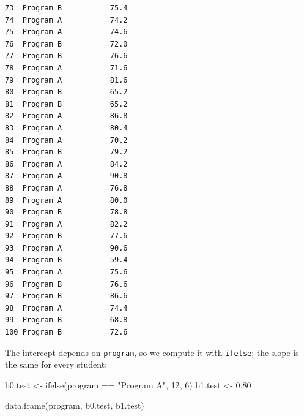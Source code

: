 \documentclass[
  letterpaper,
  DIV=11,
  numbers=noendperiod]{scrreprt}
\newenvironment{Shaded}{\begin{snugshade}}{\end{snugshade}}
\newcommand{\DecValTok}[1]{\textcolor[rgb]{0.68,0.00,0.00}{#1}}
\newcommand{\FloatTok}[1]{\textcolor[rgb]{0.68,0.00,0.00}{#1}}
\newcommand{\FunctionTok}[1]{\textcolor[rgb]{0.28,0.35,0.67}{#1}}
\newcommand{\NormalTok}[1]{\textcolor[rgb]{0.00,0.23,0.31}{#1}}
\newcommand{\OtherTok}[1]{\textcolor[rgb]{0.00,0.23,0.31}{#1}}
\newcommand{\SpecialCharTok}[1]{\textcolor[rgb]{0.37,0.37,0.37}{#1}}
\newcommand{\StringTok}[1]{\textcolor[rgb]{0.13,0.47,0.30}{#1}}
\begin{document}
\begin{verbatim}
73  Program B           75.4
74  Program A           74.2
75  Program A           74.6
76  Program B           72.0
77  Program B           76.6
78  Program A           71.6
79  Program A           81.6
80  Program B           65.2
81  Program B           65.2
82  Program A           86.8
83  Program A           80.4
84  Program A           70.2
85  Program B           79.2
86  Program A           84.2
87  Program A           90.8
88  Program A           76.8
89  Program A           80.0
90  Program B           78.8
91  Program A           82.2
92  Program B           77.6
93  Program A           90.6
94  Program B           59.4
95  Program A           75.6
96  Program B           76.6
97  Program B           86.6
98  Program A           74.4
99  Program B           68.8
100 Program B           72.6
\end{verbatim}

The intercept depends on \texttt{program}, so we compute it with
\texttt{ifelse}; the slope is the same for every student:

\begin{Shaded}
\begin{Highlighting}[]
\NormalTok{b0.test }\OtherTok{\textless{}{-}} \FunctionTok{ifelse}\NormalTok{(program }\SpecialCharTok{==} \StringTok{"Program A"}\NormalTok{, }\DecValTok{12}\NormalTok{, }\DecValTok{6}\NormalTok{)}
\NormalTok{b1.test }\OtherTok{\textless{}{-}} \FloatTok{0.80}

\FunctionTok{data.frame}\NormalTok{(program, b0.test, b1.test)}
\end{Highlighting}
\end{Shaded}
\end{document}
